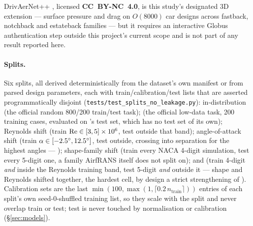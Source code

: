 \documentclass[11pt,a4paper]{article}
\begin{document}
DrivAerNet++ \citep{elrefaie2024drivaernetpp}, licensed \textbf{CC~BY-NC~4.0},
is this study's designated 3D extension --- surface pressure and drag on
$O(8000)$ car designs across fastback, notchback and estateback families --- but
it requires an interactive Globus authentication step outside this project's
current scope and is not part of any result reported here. 

\paragraph{Splits.} Six splits, all derived deterministically from the dataset's
own manifest or from parsed design parameters, each with train/calibration/test
lists that are asserted programmatically disjoint
(\texttt{tests/test\_splits\_no\_leakage.py}): in-distribution 
(the official random 800/200 train/test task);  (the official
low-data task, 200 training cases, evaluated on 's test set,
which has no test set of its own); Reynolds shift  (train
$\mathrm{Re}\in[3,5]\times10^6$, test outside that band); angle-of-attack shift
 (train $\alpha\in[-2.5^{\circ},12.5^{\circ}]$, test outside,
crossing into separation for the highest angles --- ); shape-family shift  (train every NACA
4-digit simulation, test every 5-digit one, a family AirfRANS itself does not
split on); and  (train 4-digit \emph{and} inside the
Reynolds training band, test 5-digit \emph{and} outside it --- shape and
Reynolds shifted together, the hardest cell, by design a strict strengthening
of ). Calibration sets are the last $\min(100,
\max(1,\lceil 0.2\,n_{\text{train}}\rceil))$ entries of each split's own
seed-0-shuffled training list, so they scale with the split and never overlap
train or test; test is never touched by normalisation or calibration
(\S\ref{sec:models}).
\end{document}
